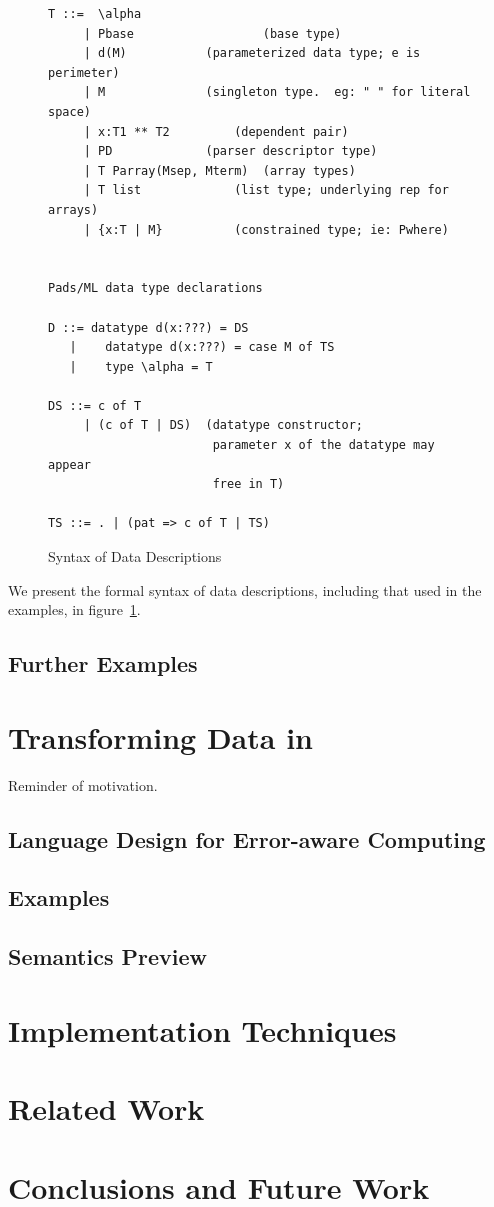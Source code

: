 \documentclass{entcs}
\begin{document}
\begin{figure}
  \centering
\begin{verbatim}
T ::=  \alpha
     | Pbase                  (base type)
     | d(M)		      (parameterized data type; e is perimeter)
     | M		      (singleton type.  eg: " " for literal space)
     | x:T1 ** T2	      (dependent pair)
     | PD		      (parser descriptor type)
     | T Parray(Msep, Mterm)  (array types)
     | T list		      (list type; underlying rep for arrays)
     | {x:T | M}	      (constrained type; ie: Pwhere)


Pads/ML data type declarations

D ::= datatype d(x:???) = DS
   |    datatype d(x:???) = case M of TS
   |    type \alpha = T

DS ::= c of T
     | (c of T | DS)  (datatype constructor; 
                       parameter x of the datatype may appear
                       free in T)

TS ::= . | (pat => c of T | TS)
\end{verbatim}
  \caption{Syntax of Data Descriptions}
  \label{fig:syntax-dd}
\end{figure}

We present the formal syntax of data descriptions, including that used
in the examples, in figure~\ref{fig:syntax-dd}.

\subsection{Further Examples}

\section{Transforming Data in \datatype{}}
\label{sec:data-transformation}

Reminder of motivation.



\subsection{Language Design for Error-aware Computing}

\subsection{Examples}

\subsection{Semantics Preview}

\section{Implementation Techniques}
\label{sec:implementation-techniques}

\section{Related Work}
\label{sec:related-work}

\section{Conclusions and Future Work}
\label{sec:conclusion}
\end{document}
